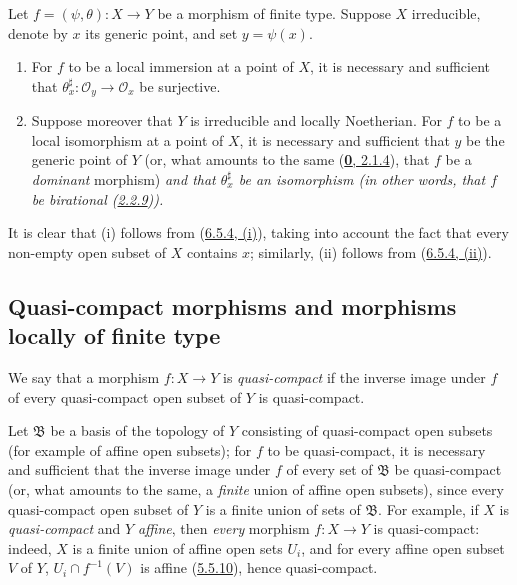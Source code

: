 \begin{corollary}[6.5.5]
\label{I.6.5.5}
Let $f=(\psi,\theta):X\to Y$ be a morphism of finite type. Suppose $X$
irreducible, denote by $x$ its generic point, and set $y=\psi(x)$.
\begin{enumerate}
  \item[\textup{(i)}] For $f$ to be a local immersion at a point of $X$, it is
    necessary and sufficient that
    $\theta_x^\sharp:\mathscr{O}_y\to\mathscr{O}_x$ be surjective.
  \item[\textup{(ii)}] Suppose moreover that $Y$ is irreducible and locally Noetherian.
    For $f$ to be a local isomorphism at a point of $X$, it is necessary and
    sufficient that $y$ be the generic point of $Y$ \upshape(or, what amounts to the
    same \textup{(\hyperref[0.2.1.4]{\textbf{0}, 2.1.4})}, that $f$ be a
    \emph{dominant} morphism) \itshape and that $\theta_x^\sharp$ be an isomorphism \upshape(in
    other words, that $f$ be \emph{birational}
    \textup{(\hyperref[I.2.2.9]{2.2.9})}).
\end{enumerate}
\end{corollary}

It is clear that (i) follows from
(\hyperref[I.6.5.4]{6.5.4, (i)}), taking into account the fact that every
non-empty open subset of $X$ contains $x$; similarly, (ii) follows from
(\hyperref[I.6.5.4]{6.5.4, (ii)}).

\subsection{Quasi-compact morphisms and morphisms locally of finite type}
\label{subsection:I.6.6}

\begin{definition}[6.6.1]
\label{I.6.6.1}
We say that a morphism $f:X\to Y$ is \emph{quasi-compact} if the inverse
image under $f$ of every quasi-compact open subset of $Y$ is quasi-compact.
\end{definition}

Let $\mathfrak{B}$ be a basis of the topology of $Y$ consisting of
quasi-compact open subsets (for example of affine open subsets); for $f$ to be
quasi-compact, it is necessary and sufficient that the inverse image under $f$
of every set of $\mathfrak{B}$ be quasi-compact (or, what amounts to the same,
a \emph{finite} union of affine open subsets), since every quasi-compact open
subset of $Y$ is a finite union of sets of $\mathfrak{B}$. For example, if $X$
is \emph{quasi-compact} and $Y$ \emph{affine}, then \emph{every} morphism
$f:X\to Y$ is quasi-compact: indeed, $X$ is a finite union of affine open
sets $U_i$, and for every affine open subset $V$ of $Y$,
$U_i\cap f^{-1}(V)$ is affine
(\hyperref[I.5.5.10]{5.5.10}), hence quasi-compact.

